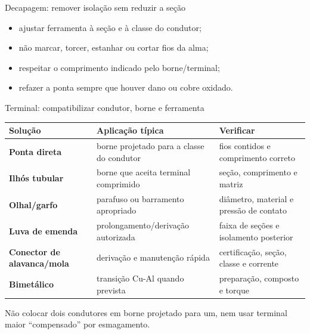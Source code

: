 \begin{frame}{Decapagem: remover isolação sem reduzir a seção}
\centering
{}
\vspace{3mm}
\begin{itemize}
\item ajustar ferramenta à seção e à classe do condutor;
\item não marcar, torcer, estanhar ou cortar fios da alma;
\item respeitar o comprimento indicado pelo borne/terminal;
\item refazer a ponta sempre que houver dano ou cobre oxidado.
\end{itemize}
\end{frame}

\begin{frame}{Terminal: compatibilizar condutor, borne e ferramenta}
\small
\begin{tabularx}{\textwidth}{>{\bfseries}p{2.5cm}X X}
\toprule
Solução & Aplicação típica & Verificar \\
\midrule
Ponta direta & borne projetado para a classe do condutor & fios contidos e comprimento correto \\
Ilhós tubular & borne que aceita terminal comprimido & seção, comprimento e matriz \\
Olhal/garfo & parafuso ou barramento apropriado & diâmetro, material e pressão de contato \\
Luva de emenda & prolongamento/derivação autorizada & faixa de seções e isolamento posterior \\
Conector de alavanca/mola & derivação e manutenção rápida & certificação, seção, classe e corrente \\
Bimetálico & transição Cu-Al quando prevista & preparação, composto e torque \\
\bottomrule
\end{tabularx}
\begin{caixaAt}
Não colocar dois condutores em borne projetado para um, nem usar terminal maior ``compensado'' por esmagamento.
\end{caixaAt}
\end{frame}


